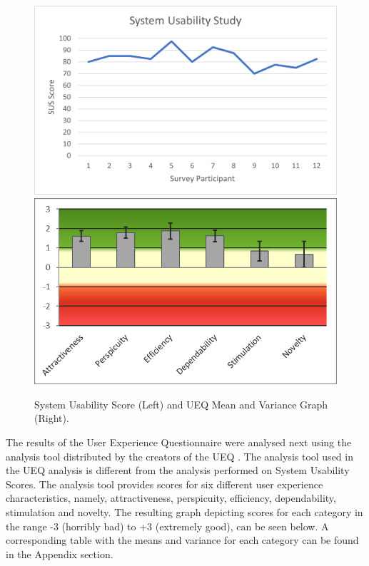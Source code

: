 \documentclass[a4,12pt]{article}
\begin{document}
\begin{figure}[htb]
    \centering
    \includegraphics[scale=0.6]{public/SUS.png}
    \includegraphics[scale=0.3]{public/results/UEQ_Scales_Mean.jpg}
    \caption{System Usability Score (Left) and UEQ Mean and Variance Graph (Right).}
    \label{fig:SUS_UEQ_Mean_Variance}
\end{figure}

The results of the User Experience Questionnaire were analysed next using the analysis tool distributed by the creators of the UEQ \cite{ueq}. The analysis tool used in the UEQ analysis is different from the analysis performed on System Usability Scores. The analysis tool provides scores for six different user experience characteristics, namely, attractiveness, perspicuity, efficiency, dependability, stimulation and novelty. The resulting graph depicting scores for each category in the range -3 (horribly bad) to +3 (extremely good), can be seen below. A corresponding table with the means and variance for each category can be found in the Appendix section.
\end{document}

